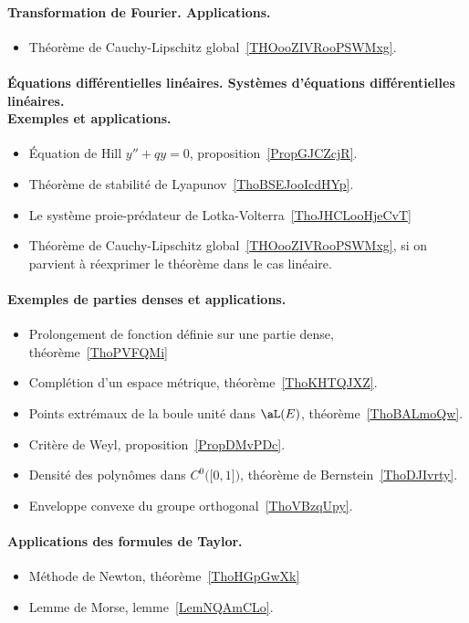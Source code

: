 \paragraph{Transformation de Fourier. Applications.}
\begin{itemize}
    \item Théorème de Cauchy-Lipschitz global~\ref{THOooZIVRooPSWMxg}.
\end{itemize}
\paragraph{Équations différentielles linéaires. Systèmes d’équations différentielles linéaires.\\ Exemples et applications.}
\begin{itemize}
    \item Équation de Hill \( y''+qy=0\), proposition~\ref{PropGJCZcjR}.
    \item Théorème de stabilité de Lyapunov~\ref{ThoBSEJooIcdHYp}.
    \item Le système proie-prédateur de Lotka-Volterra~\ref{ThoJHCLooHjeCvT}
    \item Théorème de Cauchy-Lipschitz global~\ref{THOooZIVRooPSWMxg}, si on parvient à réexprimer le théorème dans le cas linéaire.
\end{itemize}
\paragraph{Exemples de parties denses et applications.}
\begin{itemize}
    \item Prolongement de fonction définie sur une partie dense, théorème~\ref{ThoPVFQMi}
    \item Complétion d'un espace métrique, théorème~\ref{ThoKHTQJXZ}.
    \item Points extrémaux de la boule unité dans \( \aL(E)\), théorème~\ref{ThoBALmoQw}.
    \item Critère de Weyl, proposition~\ref{PropDMvPDc}.
    \item Densité des polynômes dans \( C^0\big( \mathopen[ 0 , 1 \mathclose] \big)\), théorème de Bernstein~\ref{ThoDJIvrty}.
    \item Enveloppe convexe du groupe orthogonal~\ref{ThoVBzqUpy}.
\end{itemize}
\paragraph{Applications des formules de Taylor.}
\begin{itemize}
    \item Méthode de Newton, théorème~\ref{ThoHGpGwXk}
    \item Lemme de Morse, lemme~\ref{LemNQAmCLo}.
\end{itemize}
